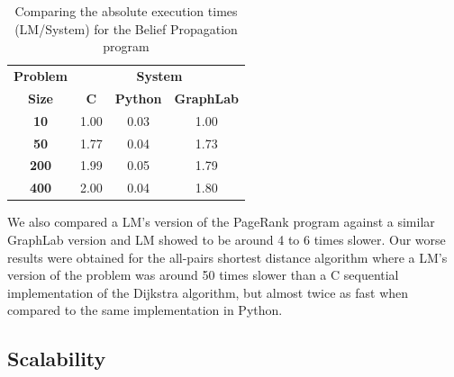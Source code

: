 \documentclass{sigplanconf}
\begin{document}
\begin{table}[ht]
\centering
{\begin{tabular}{c|c|c|c}
\textbf{Problem} & \multicolumn{3}{c}{\textbf{System}} \\
\textbf{Size} & \textbf{C} & \textbf{Python} & \textbf{GraphLab} \\
\hline\hline
\textbf{10}  & 1.00 & 0.03 & 1.00 \\
\textbf{50}  & 1.77 & 0.04 & 1.73 \\
\textbf{200} & 1.99 & 0.05 & 1.79 \\
\textbf{400} & 2.00 & 0.04 & 1.80 \\
\end{tabular}}
\caption{Comparing the absolute execution times (LM/System) for the
  Belief Propagation program}
\label{tbl:comp_bp}
\end{table}

We also compared a LM's version of the PageRank program against a
similar GraphLab version and LM showed to be around 4 to 6 times
slower. Our worse results were obtained for the all-pairs shortest
distance algorithm where a LM's version of the problem was around 50
times slower than a C sequential implementation of the Dijkstra
algorithm, but almost twice as fast when compared to the same
implementation in Python.


\subsection{Scalability}
\end{document}
